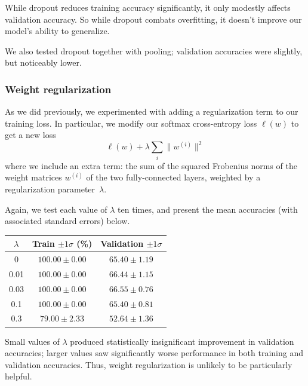 \documentclass{article}
\newcommand{\sind}[1]{^{(#1)}}
\begin{document}
\begin{multicols}{2}
While dropout reduces training accuracy significantly,
it only modestly affects validation accuracy.
So while dropout combats overfitting,
it doesn't improve our model's ability to generalize.

We also tested dropout together with pooling;
validation accuracies were slightly, but noticeably lower.


\subsubsection{Weight regularization}

As we did previously,  %
we experimented with adding a regularization term
to our training loss.
In particular, we modify our softmax cross-entropy loss $\ell(w)$
to get a new loss
\begin{equation}
    \ell(w) + \lambda\sum_i \lVert w\sind{i} \rVert^2
\end{equation}
where we include an extra term:
the sum of the squared Frobenius norms of the weight matrices $w\sind{i}$
of the two fully-connected layers,
weighted by a regularization parameter~$\lambda$.

Again, we test each value of $\lambda$ ten times,
and present the mean accuracies (with associated standard errors) below.

\begin{center}
    \begin{tabular}{c|cc}
        $\lambda$ & Train $\pm 1 \sigma$ (\%) & Validation $\pm 1 \sigma$\\\hline
        0    & $100.00 \pm 0.00$ & $65.40 \pm 1.19$ \\
        0.01 & $100.00 \pm 0.00$ & $66.44 \pm 1.15$ \\
        0.03 & $100.00 \pm 0.00$ & $66.55 \pm 0.76$ \\
        0.1  & $100.00 \pm 0.00$ & $65.40 \pm 0.81$ \\
        0.3  &  $79.00 \pm 2.33$ & $52.64 \pm 1.36$ \\
    \end{tabular}
\end{center}
Small values of $\lambda$ produced
statistically insignificant improvement in validation accuracies;
larger values saw significantly worse performance
in both training and validation accuracies.
Thus, weight regularization
is unlikely to be particularly helpful.



\end{multicols}
\end{document}
